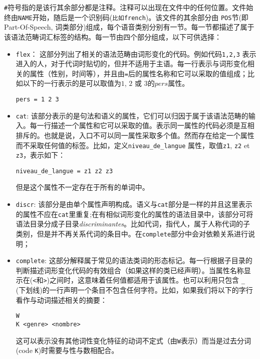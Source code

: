 \bigskip
\noindent 
 \verb$#$符号指的是该行其余部分都是注释。注释可以出现在文件中的任何位置。文件始终由\verb$NAME$开始，随后是一个识别码(\texttt{比如french})。该文件的其余部分由 \verb$POS$节(即 Part-Of-Speech, 词类部分)组成，每个语音类别分别有一节。每一节都描述了属于该语法范畴词汇标签的结构。每一节由四个部分组成，以下可供选择：
 \begin{itemize}
  \item \verb$flex$：
这部分列出了相关的语法范畴由词形变化的代码。例如代码\verb$1,2,3$ 表示进入的人，对于代词时贴切的，但并不适用于主语。每一行表示与词形变化相关的属性（性别，时间等），并且由\verb$=$后的属性名称和它可以采取的值组成；比如以下的一行表示的是可以取值为$1$, $2$ 或 $3$的$pers$属性。
 

\begin{verbatim}
pers = 1 2 3
\end{verbatim}

\item \verb$cat$: 
该部分表示的是句法和语义的属性，它们可以归因于属于该语法范畴的输入。每一行描述一个属性和它可以采取的值。表示同一属性的代码必须是互相排斥的。也就是说，入口不可以同一属性采取多个值。然而存在给定一个属性而不采取任何值的标签。比如，定义\verb$niveau_de_langue$ 属性，取值\verb$z1$, \verb$z2$ et \verb$z3$，表示如下：
\begin{verbatim}
niveau_de_langue = z1 z2 z3
\end{verbatim}

但是这个属性不一定存在于所有的单词中。


\item \verb$discr$: 
该部分是由单个属性声明构成。语义与\verb$cat$部分是一样的并且这里表示的属性不应在\verb$cat$里重复;在有相似词形变化的属性的语法目录中，该部分可将语法目录分成子目录\textit{discriminantes}。比如代词，指代人，属于人称代词的子类别，但是并不再关系代词的条目中。在\verb$complete$部分中会对依赖关系进行说明；


\item \verb$complete$:
这部分解释属于常见的语法类词的形态标记。每一行根据子目录的判断描述词形变化代码的有效组合（如果这样的类已经声明）。当属性名称显示在(\verb$<$和\verb$>$)之间时，这意味着任何值都适用于该属性。也可以利用只包含 \verb$_$ (下划线)的一行声明一个条目不包含任何字符。\index{\verb$_$}比如，如果我们将以下的字行看作与动词描述相关的摘要：

\begin{verbatim}
W
K <genre> <nombre>
\end{verbatim}


这可以表示没有其他词性变化特征的动词不定式（由\verb$W$表示）而当是过去分词(code \verb$K$)时需要与性与数相配合。

\end{itemize}

